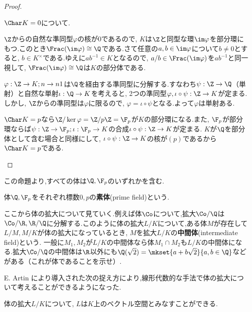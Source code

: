 \begin{proof}
	\begin{mrkw}
		\item $\Char K=0$について.
		
		\begin{eqv}
			\item $\Z$からの自然な準同型$\varphi$の核が$0$であるので, $K$は$\Z$と同型な環$\im\varphi$を部分環にもつ.このとき$\Frac(\im\varphi)\cong\Q$である.さて任意の$a,b\in\im\varphi$について$b\neq0$とすると, $b\in K^\times$である.ゆえに$ab^{-1}\in K$となるので, $a/b\in\Frac(\im\varphi)$を$ab^{-1}$と同一視して, $\Frac(\im\varphi)\cong\Q$は$K$の部分体である.
			
			\item $\varphi:\Z\to K;n\to n1$は$\Q$を経由する準同型に分解する.すなわち$\psi:\Z\to\Q$（単射）と自然な単射$\iota:\Q\to K$を考えると, 2つの準同型$\varphi,\iota\circ\psi:\Z\to K$が定まる.しかし, $\Z$からの準同型は$\varphi$に限るので, $\varphi=\iota\circ\psi$となる.よって$\varphi$は単射ある.
		\end{eqv}
	
		\item $\Char K=p$なら$\Z/\ker\varphi=\Z/p\Z=\F_p$が$K$の部分環になる.また, $\F_p$が部分環ならば$\psi:\Z\to\F_p;\iota:\F_p\to K$の合成$\iota\circ\psi:\Z\to K$が定まる. $K$が$\Q$を部分体として含む場合と同様にして, $\iota\circ\psi:\Z\to K$の核が$(p)$であるから$\Char K=p$である.
	\end{mrkw}
\end{proof}

この命題より,すべての体は$\Q, \F_p$のいずれかを含む.

\begin{defi}[素体]
	体$\Q,\F_p$をそれぞれ標数$0,p$の\textbf{素体}(prime field)という.
\end{defi}

ここから体の拡大について見ていく.例えば体$\Co$について,拡大$\Co/\Q$は$\Co/\R,\R/\Q$に分解する.このように体の拡大$L/K$について,ある体$M$が存在して$L/M,M/K$が体の拡大になっているとき, $M$を拡大$L/K$の\textbf{中間体}(intermediate field)という. 一般に$M_1,M_2$が$L/K$の中間体なら体$M_1\cap M_2$も$L/K$の中間体になる.拡大$\Co/\Q$の中間体は$\R$以外にも$\Q(\sqrt{2})=\mkset{a+b\sqrt{2}}{a,b\in\Q}$などがある（これが体であることを示せ）.

E. Artin により導入された次の捉え方により,線形代数的な手法で体の拡大について考えることができるようになった.

\begin{prop}
	体の拡大$L/K$について, $L$は$K$上のベクトル空間とみなすことができる.
\end{prop}

